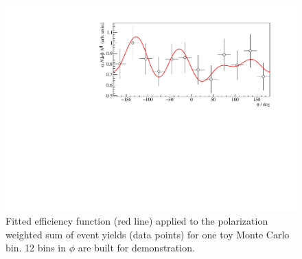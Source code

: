 \begin{figure}[htbp]
	\centering
	\includegraphics[width=\linewidth]{../RooFit/plots/toyMC_eff_unbinned_fit.pdf}
	\caption{Fitted efficiency function (red line) applied to the polarization weighted sum of event yields (data points) for one toy Monte Carlo bin. 12 bins in $\phi$ are built for demonstration.}
	\label{fig:toyMCeff}
\end{figure}
